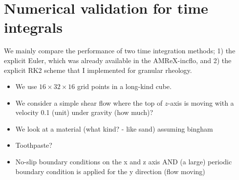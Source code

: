 \section{Numerical validation for time integrals}
We mainly compare the performance of two time integration methods; 1) the explicit Euler, which was already available in the AMReX-incflo, and 2) the explicit RK2 scheme that I implemented for granular rheology.
\begin{itemize}
  \item We use $16 \times 32 \times 16$ grid points in a long-kind cube.
  \item We consider a simple shear flow where the top of $z$-axis is moving with a velocity 0.1 (unit) under gravity (how much)?  \item We look at a material (what kind? - like sand) assuming bingham 
  \item Toothpaste?
  \item No-slip boundary conditions on the x and z axis AND (a large) periodic boundary condition is applied for the y direction (flow moving)
\end{itemize}



